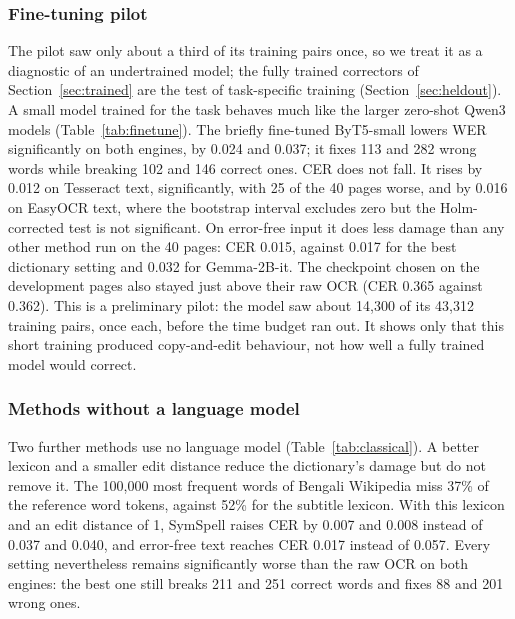 \documentclass[conference]{IEEEtran}
\begin{document}


\subsubsection{Fine-tuning pilot}
\label{sec:finetune}
The pilot saw only about a third of its training pairs once, so we treat it as a diagnostic of an undertrained model; the fully trained correctors of Section~\ref{sec:trained} are the test of task-specific training (Section~\ref{sec:heldout}).
A small model trained for the task behaves much like the larger zero-shot Qwen3 models (Table~\ref{tab:finetune}). The briefly fine-tuned ByT5-small lowers WER significantly on both engines, by 0.024 and 0.037; it fixes 113 and 282 wrong words while breaking 102 and 146 correct ones. CER does not fall. It rises by 0.012 on Tesseract text, significantly, with 25 of the 40 pages worse, and by 0.016 on EasyOCR text, where the bootstrap interval excludes zero but the Holm-corrected test is not significant. On error-free input it does less damage than any other method run on the 40 pages: CER 0.015, against 0.017 for the best dictionary setting and 0.032 for Gemma-2B-it. The checkpoint chosen on the development pages also stayed just above their raw OCR (CER 0.365 against 0.362). This is a preliminary pilot: the model saw about 14{,}300 of its 43{,}312 training pairs, once each, before the time budget ran out. It shows only that this short training produced copy-and-edit behaviour, not how well a fully trained model would correct.



\subsubsection{Methods without a language model}
\label{sec:classical}
Two further methods use no language model (Table~\ref{tab:classical}). A better lexicon and a smaller edit distance reduce the dictionary's damage but do not remove it. The 100{,}000 most frequent words of Bengali Wikipedia miss 37\% of the reference word tokens, against 52\% for the subtitle lexicon. With this lexicon and an edit distance of 1, SymSpell raises CER by 0.007 and 0.008 instead of 0.037 and 0.040, and error-free text reaches CER 0.017 instead of 0.057. Every setting nevertheless remains significantly worse than the raw OCR on both engines: the best one still breaks 211 and 251 correct words and fixes 88 and 201 wrong ones.
\end{document}
